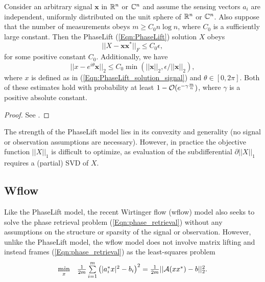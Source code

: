 \begin{theorem}  \label{Thm:PhaseLift_approx}
Consider an arbitrary signal $\mathbf{x}$ in ${\mathbb R}^n$ or ${\mathbb C}^n$ and assume the sensing vectors $a_i$ are independent, uniformly distributed on the unit sphere of ${\mathbb R}^n$ or ${\mathbb C}^n$.  Also suppose that the number of measurements obeys $m \geq C_0 n \log n $, where $C_0$ is a sufficiently large constant.  Then the PhaseLift (\ref{Eqn:PhaseLift}) solution $X$ obeys
\begin{equation}				\label{Eqn:Thm_PhaseLift_approx_X}
||X - \mathbf{x}\mathbf{x}^*||_F \leq C_0 \epsilon,
\end{equation}
for some positive constant $C_0$.  Additionally, we have
\begin{equation}		\label{Eqn:Thm_PhaseLift_approx_x}
||x - e^{i \theta}\mathbf{x}||_2 \leq C_0 \min(||\mathbf{x}||_2, \epsilon / ||\mathbf{x}||_2),
\end{equation}
where $x$ is defined as in (\ref{Eqn:PhaseLift_solution_signal}) and $\theta \in [0, 2\pi]$.
Both of these estimates hold with probability at least $1 - {\mathcal O}(e^{-\gamma \frac{m}{n}})$, where $\gamma$ is a positive absolute constant.
\end{theorem}
\begin{proof}
See \cite[Section 6]{candes2013phaselift}.
\end{proof}


The strength of the PhaseLift model lies in its convexity and generality (no signal or observation assumptions are necessary).  
However, in practice the objective function $||X||_1$ is difficult to optimize, as evaluation of the subdifferential $\partial ||X||_1$ requires a (partial) SVD of $X$.





\subsection{Wflow}


Like the PhaseLift model, the recent Wirtinger flow (wflow) model \cite{DBLP:journals/tit/CandesLS15} also seeks to solve the phase retrieval problem (\ref{Eqn:phase_retrieval}) without any assumptions on the structure or sparsity of the signal or observation.  However, unlike the PhaseLift model, the wflow model does not involve matrix lifting and instead frames (\ref{Eqn:phase_retrieval}) as the least-squares problem
\begin{equation} 				\label{Eqn:wflow_least-squares}
\begin{array}{ll}
	\min\limits_{\substack{x}}
		&	\frac{1}{2m} \sum\limits_{\substack{i=1}}^{\substack{m}} \left( |a_i^*x|^2 - b_i \right)^2
			= \frac{1}{2m} || {\mathcal A}(xx^*) - b||_2^2.
\end{array}
\end{equation}


